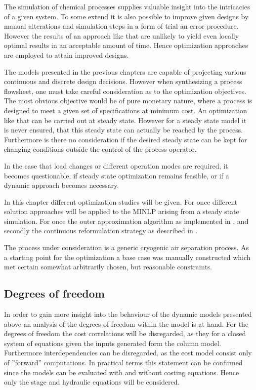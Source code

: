 The simulation of chemical processes supplies valuable insight into the intricacies of a given system.
To some extend it is also possible to improve given designs by manual alterations and simulation
steps in a form of trial an error procedure. However the results of an approach like that are unlikely
to yield even locally optimal results in an acceptable amount of time. Hence optimization approaches
are employed to attain improved designs.

The models presented in the previous chapters are capable of projecting various continuous and
discrete design decisions. However when synthesizing a process flowsheet, one must take careful
consideration as to the optimization objectives. The most obvious objective would be of
pure monetary nature, where a process is designed to meet a given set of specifications
at minimum cost. An optimization like that can be carried out at steady state. However for
a steady state model it is never ensured, that this steady state can actually be reached
by the process. Furthermore is there no consideration if the desired steady state can be kept for
changing conditions outside the control of the process operator.

In the case that load changes or different operation modes are required, it becomes questionable,
if steady state optimization remains feasible, or if a dynamic approach becomes necessary.

In this chapter different optimization studies will be given. For once different solution approaches
will be applied to the MINLP arising from a steady state simulation. For once the outer approximation
algorithm as implemented in \gproms, and secondly the continuous reformulation strategy as described
in .

The process under consideration is a generic cryogenic air separation process. As a starting point for the
optimization a base case was manually constructed which met certain somewhat arbitrarily chosen,
but reasonable constraints.


    \subsection{Degrees of freedom}
    In order to gain more insight into the behaviour of the dynamic models presented above an analysis
    of the degrees of freedom within the model is at hand. For the degrees of freedom the cost correlations
    will be disregarded, as they for a closed system of equations given the inputs generated form the column
    model. Furthermore interdependencies can be disregarded, as the cost model consist only of ''forward''
    computations. In practical terms this statement can be confirmed since the models can be evaluated
    with and without costing equations. Hence only the stage and hydraulic equations will be considered.

